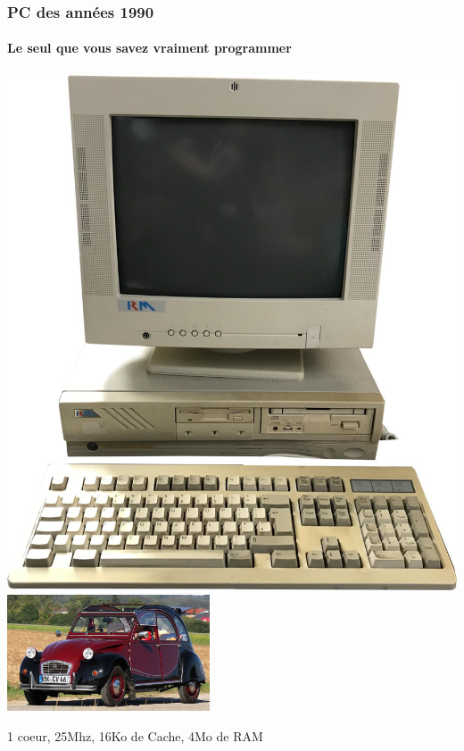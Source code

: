\documentclass[xcolor={x11names,svgnames}]{beamer}
\begin{document}
\begin{frame}
  \frametitle{PC des années 1990}
  \framesubtitle{Le seul que vous savez vraiment programmer}
  
  \centering
  \includegraphics[height=0.5\textheight]{old_pc}
  \hfill
  \includegraphics[width=6cm]{2cv}

  \bigskip

  1 coeur, 25Mhz, 16Ko de Cache, 4Mo de RAM
\end{frame}

\end{document}
